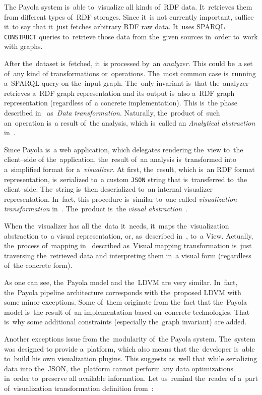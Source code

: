 The Payola system is~able to~visualize all kinds of~RDF data. It~retrieves them from different
types of~RDF storages. Since it~is not currently important, suffice it~to say that it~just fetches
arbitrary RDF raw data. It~uses SPARQL \texttt{CONSTRUCT} queries to~retrieve those data from
the~given sources in~order to~work with graphs.

After the~dataset is~fetched, it~is processed by~an \emph{analyzer}. This could be~a set of~any kind
of transformations or~operations. The~most common case is~running a~SPARQL query
on the~input graph. The~only invariant is~that the~analyzer retrieves a~RDF graph
representation and its output is~also a~RDF graph representation (regardless of~a concrete
implementation). This is~the phase described in~\cite{ldvm} as~\emph{Data transformation}.
Naturally, the~product of~such an~operation is~a result of~the analysis, which is~called an
\emph{Analytical abstraction} in~\cite{ldvm}.

Since Payola is~a web application, which delegates rendering the~view to~the client--side
of the~application, the~result of~an analysis is~transformed into a~simplified format for a~\emph{visualizer}.
At first, the~result, which is~an RDF format representation, is~serialized to~a custom \texttt{JSON} string
that is~transferred to~the client--side. The~string is~then deserialized to~an internal visualizer
representation. In~fact, this procedure is~similar to~one called \emph{visualization transformation}
in~\cite{ldvm}. The~product is~the \emph{visual abstraction}~\cite{ldvm}.

When the~visualizer has all the~data it~needs, it~maps the~visualization abstraction to~a visual
representation, or, as~described in~\cite{ldvm}, to~a View. Actually, the~process of~mapping in~\cite{ldvm}
described as~Visual mapping transformation is~just traversing the~retrieved data and interpreting
them in~a visual form (regardless of~the concrete form).

As one can see, the~Payola model and the~LDVM are very similar. In~fact, the~Payola pipeline
architecture corresponds with the~proposed LDVM with some minor exceptions. Some of~them
originate from the~fact that the~Payola model is~the result of~an implementation
based on~concrete technologies. That is~why some additional constraints (especially
the~graph invariant) are added.

Another exceptions issue from the~modularity of~the Payola system. The~system was designed
to provide a~platform, which also means that the~developer is~able to~build his own visualization 
plugins. This suggests as~well that while serializing data into the~JSON, the~platform cannot perform
any data optimizations in~order to~preserve all available information. Let us~remind the~reader of
a~part of~visualization transformation definition from~\cite{ldvm}:

